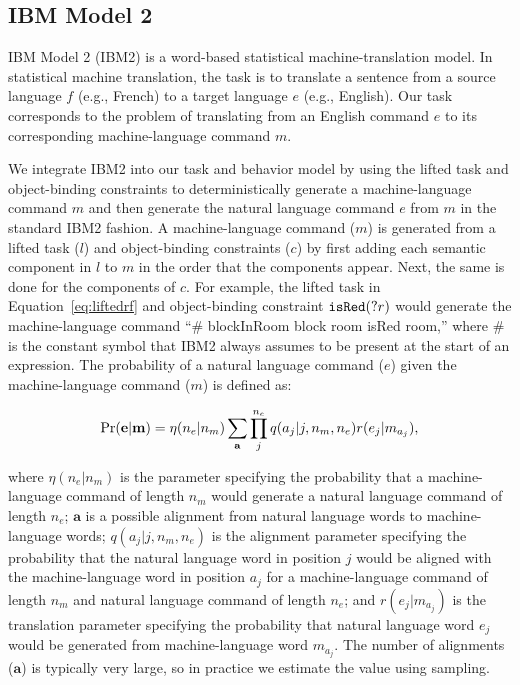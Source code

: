 \documentclass[conference]{IEEEtran}
\begin{document}
\subsection{IBM Model 2}

IBM Model 2 (IBM2) \cite{brown90,brown93} is a word-based statistical machine-translation model. In statistical machine translation, the task is to translate a sentence from a source language $f$ (e.g., French) to a target language $e$ (e.g., English). Our task corresponds to the problem of translating from an English command $e$ to its corresponding machine-language command $m$. 

We integrate IBM2 into our task and behavior model by using the lifted task and object-binding constraints to deterministically generate a machine-language command $m$ and then generate the natural language command $e$ from $m$ in the standard IBM2 fashion. 
A machine-language command ($m$) is generated from a lifted task ($l$) and object-binding constraints ($c$) by first adding each semantic component in $l$
to $m$ in the order that the components appear. Next, the same is done for the components of $c$. For example, the lifted task in Equation~\ref{eq:liftedrf} and object-binding constraint ${\tt isRed}(?r)$ would generate the machine-language command ``\# blockInRoom block room isRed room,'' where \# is the constant symbol that IBM2 always assumes to be present at the start of an expression. The probability of a natural language command ($e$) given the machine-language command ($m$) is defined as:

{\small
\begin{equation}
\vspace{-1em}
\Pr({\mathbf e} | {\mathbf m}) = \eta(n_e | n_m) \sum_{\mathbf a} \prod_j^{n_e} q(a_j | j, n_m, n_e) r(e_j | m_{a_j}),
\end{equation}
}

\noindent where $\eta(n_e | n_m)$ is the parameter specifying the probability that a machine-language command of length $n_m$ %
would generate a natural language command of length $n_e$; %
${\mathbf a}$ is a possible alignment from natural language words to machine-language words; $q(a_j | j, n_m, n_e)$ is the alignment parameter specifying the probability that the natural language word in position $j$ would be aligned with the machine-language word in position $a_j$ for a machine-language command of length $n_m$ and natural language command of length $n_e$;  and $r(e_j | m_{a_j})$ is the translation parameter specifying the probability that natural language word $e_j$ would be generated from machine-language word $m_{a_j}$. The number of alignments (${\mathbf a}$) is typically very large, so in practice we estimate the value using sampling. 
 
\end{document}
